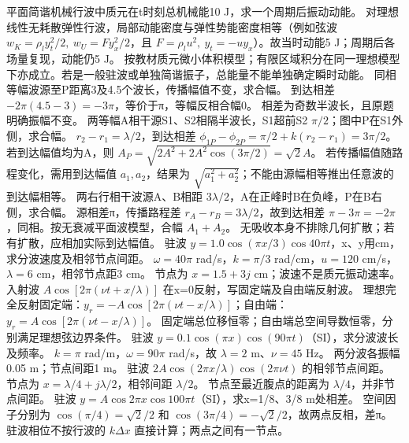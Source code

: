 \problemtext 平面简谐机械行波中质元在t时刻总机械能10 J，求一个周期后振动动能。
\workings 对理想线性无耗散弹性行波，局部动能密度与弹性势能密度相等（例如弦波 $w_K=\rho_l y_t^2/2,\ w_U=F y_x^2/2$，且 $F=\rho_l u^2,\ y_t=-uy_x$）。故当时动能5 J；周期后各场量复现，动能仍5 J。
\crosscheck 按教材质元微小体积模型；有限区域积分在同一理想模型下亦成立。若是一般驻波或单独简谐振子，总能量不能单独确定瞬时动能。
\problemtext 同相等幅波源至P距离3及4.5个波长，传播幅值不变，求合幅。
\workings 到达相差 $-2\pi(4.5-3)=-3\pi$，等价于π，等幅反相合幅0。
\crosscheck 相差为奇数半波长，且原题明确振幅不变。
\problemtext 两等幅A相干源S1、S2相隔半波长，S1超前S2 $\pi/2$；图中P在S1外侧，求合幅。
\workings $r_2-r_1=\lambda/2$，到达相差 $\phi_{1P}-\phi_{2P}=\pi/2+k(r_2-r_1)=3\pi/2$。若到达幅值均为A，则 $A_P=\sqrt{2A^2+2A^2\cos(3\pi/2)}=\sqrt2 A$。
\crosscheck 若传播幅值随路程变化，需用到达幅值 $a_1,a_2$，结果为 $\sqrt{a_1^2+a_2^2}$；不能由源幅相等推出任意波的到达幅相等。
\problemtext 两右行相干波源A、B相距 $3\lambda/2$，A在正峰时B在负峰，P在B右侧，求合幅。
\workings 源相差π，传播路程差 $r_A-r_B=3\lambda/2$，故到达相差 $\pi-3\pi=-2\pi$，同相。按无衰减平面波模型，合幅 $A_1+A_2$。
\crosscheck 无吸收本身不排除几何扩散；若有扩散，应相加实际到达幅值。
\problemtext 驻波 $y=1.0\cos(\pi x/3)\cos40\pi t$，x、y用cm，求分波速度及相邻节点间距。
\workings $\omega=40\pi$ rad/s，$k=\pi/3$ rad/cm，$u=120$ cm/s，$\lambda=6$ cm，相邻节点距3 cm。
\crosscheck 节点为 $x=1.5+3j$ cm；波速不是质元振动速率。
\problemtext 入射波 $A\cos[2\pi(\nu t+x/\lambda)]$ 在x=0反射，写固定端及自由端反射波。
\workings 理想完全反射固定端：$y_r=-A\cos[2\pi(\nu t-x/\lambda)]$；自由端：$y_r=A\cos[2\pi(\nu t-x/\lambda)]$。
\crosscheck 固定端总位移恒零；自由端总空间导数恒零，分别满足理想弦边界条件。
\problemtext 驻波 $y=0.1\cos(\pi x)\cos(90\pi t)$（SI），求分波波长及频率。
\workings $k=\pi$ rad/m，$\omega=90\pi$ rad/s，故 $\lambda=2$ m、$\nu=45$ Hz。
\crosscheck 两分波各振幅0.05 m；节点间距1 m。
\problemtext 驻波 $2A\cos(2\pi x/\lambda)\cos(2\pi\nu t)$ 的相邻节点间距。
\workings 节点为 $x=\lambda/4+j\lambda/2$，相邻间距 $\lambda/2$。
\crosscheck 节点至最近腹点的距离为 $\lambda/4$，并非节点间距。
\problemtext 驻波 $y=A\cos2\pi x\cos100\pi t$（SI），求x=1/8、3/8 m处相差。
\workings 空间因子分别为 $\cos(\pi/4)=\sqrt2/2$ 和 $\cos(3\pi/4)=-\sqrt2/2$，故两点反相，差π。
\crosscheck 驻波相位不按行波的 $k\Delta x$ 直接计算；两点之间有一节点。
